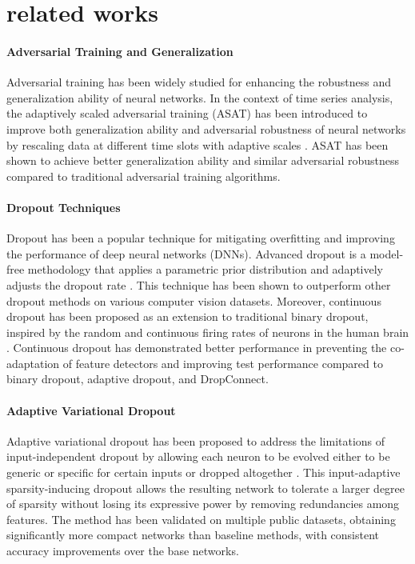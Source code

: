 \section{related works}
\paragraph{Adversarial Training and Generalization}
Adversarial training has been widely studied for enhancing the robustness and generalization ability of neural networks. In the context of time series analysis, the adaptively scaled adversarial training (ASAT) has been introduced to improve both generalization ability and adversarial robustness of neural networks by rescaling data at different time slots with adaptive scales \cite{2108.08976}. ASAT has been shown to achieve better generalization ability and similar adversarial robustness compared to traditional adversarial training algorithms.

\paragraph{Dropout Techniques}
Dropout has been a popular technique for mitigating overfitting and improving the performance of deep neural networks (DNNs). Advanced dropout is a model-free methodology that applies a parametric prior distribution and adaptively adjusts the dropout rate \cite{2010.05244}. This technique has been shown to outperform other dropout methods on various computer vision datasets. Moreover, continuous dropout has been proposed as an extension to traditional binary dropout, inspired by the random and continuous firing rates of neurons in the human brain \cite{1911.12675}. Continuous dropout has demonstrated better performance in preventing the co-adaptation of feature detectors and improving test performance compared to binary dropout, adaptive dropout, and DropConnect.

\paragraph{Adaptive Variational Dropout}
Adaptive variational dropout has been proposed to address the limitations of input-independent dropout by allowing each neuron to be evolved either to be generic or specific for certain inputs or dropped altogether \cite{1805.10896}. This input-adaptive sparsity-inducing dropout allows the resulting network to tolerate a larger degree of sparsity without losing its expressive power by removing redundancies among features. The method has been validated on multiple public datasets, obtaining significantly more compact networks than baseline methods, with consistent accuracy improvements over the base networks.

